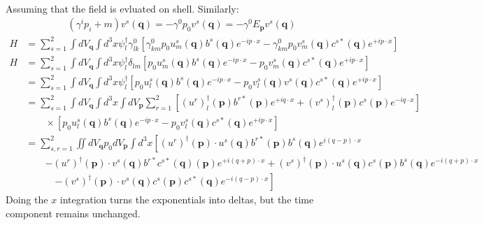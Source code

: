 \documentclass[12pt,a4]{article}
\begin{document}
\begin{enumerate}
\begin{align*}
    \end{align*}
    Assuming that the field is evluated on shell.
    Similarly:
    \begin{align*}
      (\gamma^i p_i + m) v^s(\mathbf{q}) = - \gamma^0p_0 v^s(\mathbf{q}) = - \gamma^0E_\mathbf{p} v^s(\mathbf{q})
    \end{align*}
    \begin{align*}
      H &= \sum_{s = 1}^2 \int d V_\mathbf{q} \int d^3 x\psi^\dagger_{l} \gamma^0_{lk} \left[ \gamma^0_{km}p_0 u^s_m(\mathbf{q}) b ^s (\mathbf{q}) e^{- i p \cdot x} - \gamma^0_{km}p_0 v^s_m(\mathbf{q}) c ^{s*} (\mathbf{q})e^{+ i p \cdot x} \right]\\
      H &= \sum_{s = 1}^2 \int d V_\mathbf{q} \int d^3 x\psi^\dagger_{l} \delta_{lm} \left[ p_0 u^s_m(\mathbf{q}) b ^s (\mathbf{q}) e^{- i p \cdot x} - p_0 v^s_m(\mathbf{q}) c ^{s*} (\mathbf{q})e^{+ i p \cdot x} \right]\\
        &= \sum_{s = 1}^2 \int d V_\mathbf{q} \int d^3 x\psi^\dagger_{l} \left[ p_0 u^s_l(\mathbf{q}) b ^s (\mathbf{q}) e^{- i p \cdot x} - p_0 v^s_l(\mathbf{q}) v^s(\mathbf{q}) c ^{s*} (\mathbf{q})e^{+ i p \cdot x} \right]\\
        &= \sum_{s = 1}^2 \int d V_\mathbf{q} \int d^3 x \int d V_\mathbf{p} \sum_{r = 1}^2\left[(u^r)^\dagger_l(\mathbf{p}) b ^{r*} (\mathbf{p})e^{+ i q \cdot x} + (v^{s})^\dagger_l(\mathbf{p}) c ^{s} (\mathbf{p})e^{- i q \cdot x}\right] \\
        &\qquad \times \left[ p_0 u^s_l(\mathbf{q}) b ^s (\mathbf{q}) e^{- i p \cdot x} - p_0 v^s_l(\mathbf{q}) c ^{s*} (\mathbf{q})e^{+ i p \cdot x} \right]\\
        &= \sum_{s,r = 1}^2 \iint d V_\mathbf{q} p_0 d V_\mathbf{p} \int d^3 x \left[(u^r)^\dagger(\mathbf{p}) \cdot u^s(\mathbf{q}) b ^{r*} (\mathbf{p}) b ^s (\mathbf{q}) e^{i (q - p)\cdot x}\right.\\
        & \qquad \left.  - (u^r)^\dagger(\mathbf{p}) \cdot v^s(\mathbf{q}) b ^{r*} c ^{s*} (\mathbf{q}) (\mathbf{p})e^{+ i (q + p)\cdot x} + (v^{s})^\dagger(\mathbf{p}) \cdot u^s(\mathbf{q}) c ^{s} (\mathbf{p}) b ^s (\mathbf{q})e^{- i (q + p) \cdot x} \right.\\
        & \qquad \quad \left. - (v^{s})^\dagger(\mathbf{p}) \cdot v^s(\mathbf{q}) c ^{s} (\mathbf{p}) c ^{s*} (\mathbf{q}) e^{- i (q - p) \cdot x}\right] 
    \end{align*}
    Doing the $x$ integration turns the exponentials into deltas, but the time component remains unchanged.
    \begin{align*}

\end{align*}
\end{enumerate}
\end{document}

